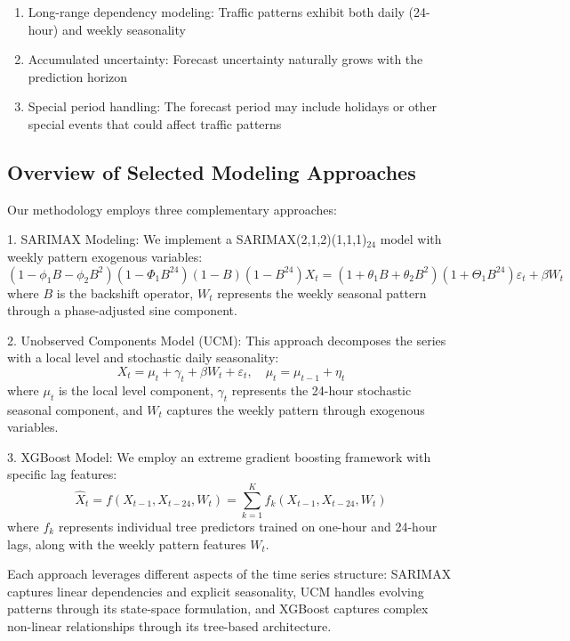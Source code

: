 \documentclass{article}
\begin{document}
\begin{enumerate}
    \item Long-range dependency modeling: Traffic patterns exhibit both daily (24-hour) and weekly seasonality
    \item Accumulated uncertainty: Forecast uncertainty naturally grows with the prediction horizon
    \item Special period handling: The forecast period may include holidays or other special events that could affect traffic patterns
\end{enumerate}

\subsection{Overview of Selected Modeling Approaches}
Our methodology employs three complementary approaches:

1. SARIMAX Modeling: We implement a SARIMAX(2,1,2)(1,1,1)$_{24}$ model with weekly pattern exogenous variables:
   \begin{equation}
   (1-\phi_1B-\phi_2B^2)(1-\Phi_1B^{24})(1-B)(1-B^{24})X_t = (1+\theta_1B+\theta_2B^2)(1+\Theta_1B^{24})\varepsilon_t + \beta W_t
   \end{equation}
   where $B$ is the backshift operator, $W_t$ represents the weekly seasonal pattern through a phase-adjusted sine component.

2. Unobserved Components Model (UCM): This approach decomposes the series with a local level and stochastic daily seasonality:
   \begin{equation}
   X_t = \mu_t + \gamma_t + \beta W_t + \varepsilon_t, \quad \mu_t = \mu_{t-1} + \eta_t
   \end{equation}
   where $\mu_t$ is the local level component, $\gamma_t$ represents the 24-hour stochastic seasonal component, and $W_t$ captures the weekly pattern through exogenous variables.

3. XGBoost Model: We employ an extreme gradient boosting framework with specific lag features:
   \begin{equation}
   \hat{X}_t = f(X_{t-1}, X_{t-24}, W_t) = \sum_{k=1}^K f_k(X_{t-1}, X_{t-24}, W_t)
   \end{equation}
   where $f_k$ represents individual tree predictors trained on one-hour and 24-hour lags, along with the weekly pattern features $W_t$.

Each approach leverages different aspects of the time series structure: SARIMAX captures linear dependencies and explicit seasonality, UCM handles evolving patterns through its state-space formulation, and XGBoost captures complex non-linear relationships through its tree-based architecture.
\end{document}
